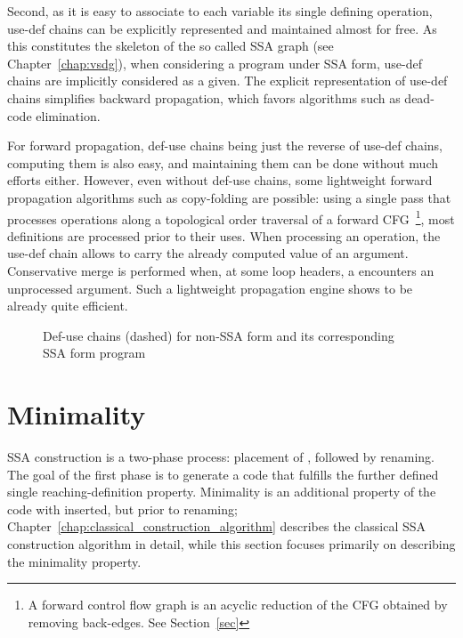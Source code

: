 Second, as it is easy to associate to each variable its single defining operation, use-def chains can be explicitly represented and maintained almost for free. As this constitutes the skeleton of the so called SSA graph (see Chapter~\ref{chap:vsdg}), when considering a program under SSA form, use-def chains are implicitly considered as a given. 
The explicit representation of use-def chains simplifies backward 
propagation, which favors algorithms such as dead-code elimination. 

For forward propagation, def-use chains being just the reverse of use-def chains, computing them is also easy, and maintaining them can be done without much efforts either. 
However, even without def-use chains, some lightweight forward propagation algorithms such as copy-folding are possible:
using a single pass that processes operations along a topological order traversal of a forward CFG~\footnote{A forward control flow graph is an acyclic reduction of the CFG obtained by removing back-edges. See Section~\ref{sec}}, most definitions are processed prior to their uses. 
When processing an operation, the use-def chain allows to carry the already computed value of an argument. Conservative merge is performed when, at some loop headers, a \phifun encounters an unprocessed argument.
Such a lightweight  propagation engine shows to be already quite efficient.


\begin{figure}
\caption{Def-use chains (dashed) for non-SSA form and its corresponding SSA form program} 
\label{fig:properties_and_flavors:du} 
\end{figure}



\section{Minimality}
\label{sec:properties_and_flavors:minimality}

SSA construction is a two-phase process: placement of \phifuns,
followed by renaming. The goal of the first phase is to generate a code that fulfills the further defined single reaching-definition property. Minimality is an additional property of the code with 
\phifuns inserted, but prior to renaming; Chapter~\ref{chap:classical_construction_algorithm} describes the classical SSA
construction algorithm in detail, while this section focuses
primarily on describing the minimality property.  

